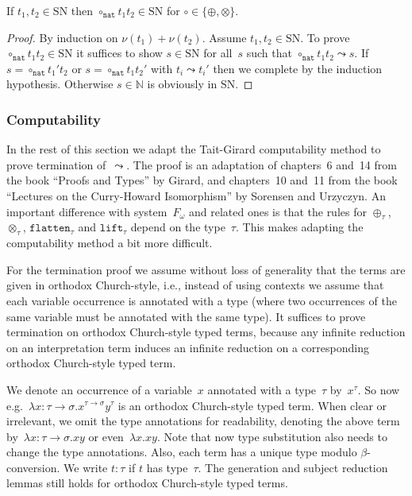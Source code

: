 \documentclass[runningheads,a4paper]{llncs}
\newcommand{\arrtype}{\rightarrow}
\newcommand{\nat}{\mathtt{nat}}
\newcommand{\flatten}{\mathtt{flatten}}
\newcommand{\lift}{\mathtt{lift}}
\newcommand{\SN}{\mathrm{SN}}
\begin{document}
\begin{lemma}\label{lem_circ_sn_base}
  If $t_1,t_2 \in \SN$ then $\circ_\nat t_1 t_2 \in \SN$ for $\circ
  \in \{\oplus,\otimes\}$.
\end{lemma}

\begin{proof}
  By induction on $\nu(t_1) + \nu(t_2)$. Assume $t_1,t_2 \in \SN$. To
  prove $\circ_\nat t_1 t_2 \in \SN$ it suffices to show $s \in \SN$
  for all~$s$ such that $\circ_\nat t_1 t_2 \leadsto s$. If $s =
  \circ_\nat t_1' t_2$ or $s = \circ_\nat t_1 t_2'$ with $t_i \leadsto
  t_i'$ then we complete by the induction hypothesis. Otherwise $s \in
  \mathbb{N}$ is obviously in $\SN$.
\end{proof}

\subsubsection{Computability}

In the rest of this section we adapt the Tait-Girard computability
method to prove termination of~$\leadsto$. The proof is an adaptation
of chapters~6 and~14 from the book ``Proofs and Types'' by Girard, and
chapters~10 and~11 from the book ``Lectures on the Curry-Howard
Isomorphism'' by Sorensen and Urzyczyn. An important difference with
system~$F_\omega$ and related ones is that the rules for
$\oplus_\tau$, $\otimes_\tau$, $\flatten_\tau$ and $\lift_\tau$ depend
on the type~$\tau$. This makes adapting the computability method a bit
more difficult.

For the termination proof we assume without loss of generality that
the terms are given in orthodox Church-style, i.e., instead of using
contexts we assume that each variable occurrence is annotated with a
type (where two occurrences of the same variable must be annotated
with the same type). It suffices to prove termination on orthodox
Church-style typed terms, because any infinite reduction on an
interpretation term induces an infinite reduction on a corresponding
orthodox Church-style typed term.

We denote an occurrence of a variable~$x$ annotated with a type~$\tau$
by~$x^\tau$. So now e.g.~$\lambda x : \tau\arrtype\sigma
. x^{\tau\arrtype\sigma}y^\tau$ is an orthodox Church-style typed
term. When clear or irrelevant, we omit the type annotations for
readability, denoting the above term by~$\lambda x :
\tau\arrtype\sigma . x y$ or even~$\lambda x . x y$. Note that now
type substitution also needs to change the type annotations. Also,
each term has a unique type modulo $\beta$-conversion. We write $t :
\tau$ if $t$ has type~$\tau$. The generation and subject reduction
lemmas still holds for orthodox Church-style typed terms.
\end{document}
